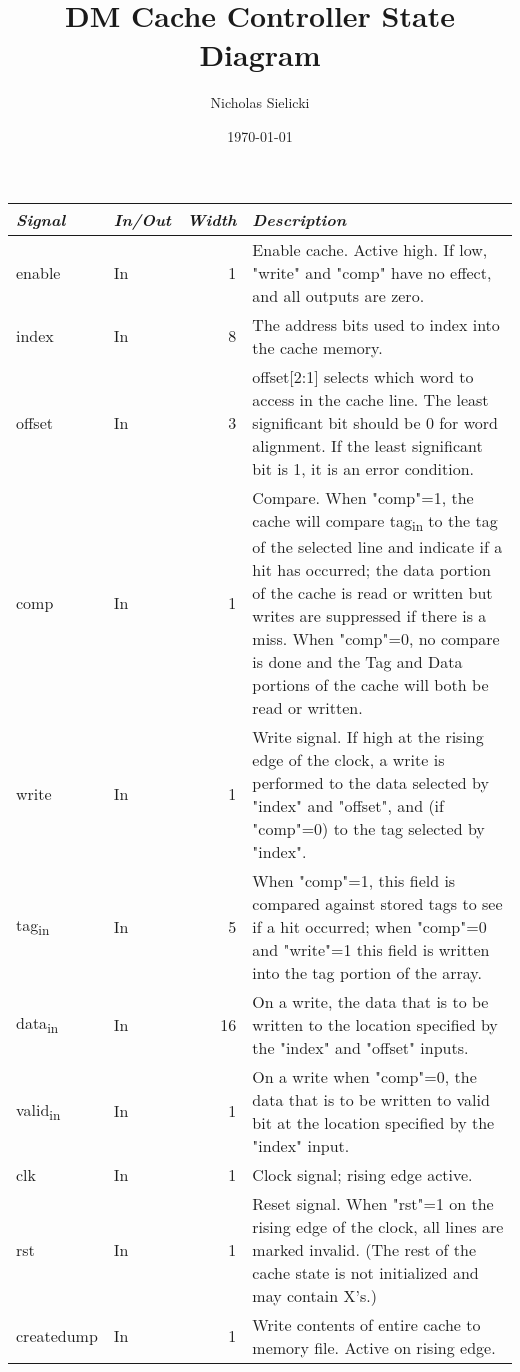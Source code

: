\documentclass[11pt]{article}
\author{Nicholas Sielicki}
\date{\today}
\title{DM Cache Controller State Diagram}
\begin{document}
\maketitle
\tableofcontents

\begin{center}
\begin{tabular}{llrl}
\emph{Signal} & \emph{In/Out} & \emph{Width} & \emph{Description}\\
\hline
enable & In & 1 & Enable cache. Active high. If low, "write" and "comp" have no effect, and all outputs are zero.\\
index & In & 8 & The address bits used to index into the cache memory.\\
offset & In & 3 & offset[2:1] selects which word to access in the cache line. The least significant bit should be 0 for word alignment. If the least significant bit is 1, it is an error condition.\\
comp & In & 1 & Compare. When "comp"=1, the cache will compare tag\textsubscript{in} to the tag of the selected line and indicate if a hit has occurred; the data portion of the cache is read or written but writes are suppressed if there is a miss. When "comp"=0, no compare is done and the Tag and Data portions of the cache will both be read or written.\\
write & In & 1 & Write signal. If high at the rising edge of the clock, a write is performed to the data selected by "index" and "offset", and (if "comp"=0) to the tag selected by "index".\\
tag\textsubscript{in} & In & 5 & When "comp"=1, this field is compared against stored tags to see if a hit occurred; when "comp"=0 and "write"=1 this field is written into the tag portion of the array.\\
data\textsubscript{in} & In & 16 & On a write, the data that is to be written to the location specified by the "index" and "offset" inputs.\\
valid\textsubscript{in} & In & 1 & On a write when "comp"=0, the data that is to be written to valid bit at the location specified by the "index" input.\\
clk & In & 1 & Clock signal; rising edge active.\\
rst & In & 1 & Reset signal. When "rst"=1 on the rising edge of the clock, all lines are marked invalid. (The rest of the cache state is not initialized and may contain X's.)\\
createdump & In & 1 & Write contents of entire cache to memory file. Active on rising edge.\\

\end{tabular}
\end{center}
\end{document}
